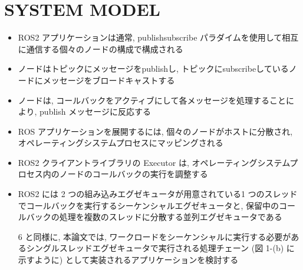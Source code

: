 
\section{SYSTEM MODEL}
\label{sec: system model}

\begin{frame}{}
\end{frame}

\begin{frame}{}
    \begin{itemize}
        \item ROS2 アプリケーションは通常, publishsubscribe パラダイムを使用して相互に通信する個々のノードの構成で構成される
        \item ノードはトピックにメッセージをpublishし, トピックにsubscribeしているノードにメッセージをブロードキャストする
        \item ノードは, コールバックをアクティブにして各メッセージを処理することにより, publish メッセージに反応する
        \item ROS アプリケーションを展開するには, 個々のノードがホストに分散され, オペレーティングシステムプロセスにマッピングされる
    \end{itemize}
\end{frame}

\begin{frame}{}
    \begin{itemize}
        \item ROS2 クライアントライブラリの Executor は, オペレーティングシステムプロセス内のノードのコールバックの実行を調整する
        \item ROS2 には 2 つの組み込みエグゼキュータが用意されている1 つのスレッドでコールバックを実行するシーケンシャルエグゼキュータと, 保留中のコールバックの処理を複数のスレッドに分散する並列エグゼキュータである
        \item [6] と同様に, 本論文では, ワークロードをシーケンシャルに実行する必要があるシングルスレッドエグゼキュータで実行される処理チェーン (図 1-(b) に示すように) として実装されるアプリケーションを検討する
    \end{itemize}
\end{frame}

